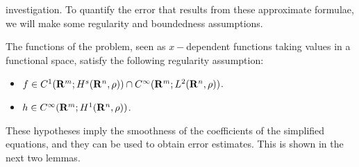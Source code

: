 investigation. To quantify the error that results from these approximate
formulae, we will make some regularity and boundedness assumptions.
\begin{assumption}
    The functions of the problem, seen as $x-$dependent functions taking values
    in a functional space, satisfy the following regularity assumption:
    \begin{itemize}
       \item  $f \in C^{1}(\mathbf R^m; H^s(\mathbf R^n,\rho)) \cap C^{\infty}(\mathbf R^m; L^{2}(\mathbf R^n,\rho))$.
       \item $h \in C^{\infty}(\mathbf R^m; H^{1}(\mathbf R^n, \rho))$.
    \end{itemize}
    \label{assumption: regularity of the functions of the problem}
\end{assumption}
 These hypotheses imply the smoothness of the coefficients of the simplified
 equations, and they can be used to obtain error estimates. This is shown in
 the next two lemmas. 
